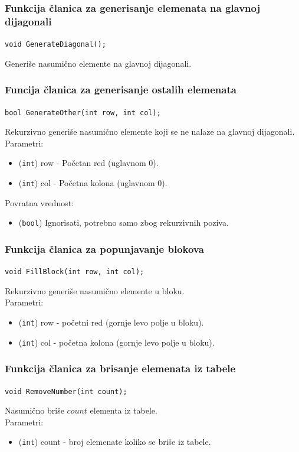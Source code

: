 \documentclass[a4paper]{article}
\begin{document}
    \subsubsection{Funkcija članica za generisanje elemenata na glavnoj dijagonali}
	\texttt{void GenerateDiagonal();}
	\par Generiše nasumično elemente na glavnoj dijagonali.

    \subsubsection{Funcija članica za generisanje ostalih elemenata}
    \texttt{bool GenerateOther(int row, int col);}
    \par Rekurzivno generiše nasumično elemente koji se ne nalaze na glavnoj dijagonali.\\
	Parametri:
    \begin{itemize}
        \item (\texttt{int}) row - Početan red (uglavnom 0).
        \item (\texttt{int}) col - Početna kolona (uglavnom 0).
    \end{itemize}
    Povratna vrednost:
    \begin{itemize}
        \item (\texttt{bool}) Ignorisati, potrebno samo zbog rekurzivnih poziva.
    \end{itemize}
    
    \subsubsection{Funkcija članica za popunjavanje blokova}
    \texttt{void FillBlock(int row, int col);}
    \par Rekurzivno generiše nasumično elemente u bloku.\\
    Parametri:
    \begin{itemize}
        \item (\texttt{int}) row - početni red (gornje levo polje u bloku).
        \item (\texttt{int}) col - početna kolona (gornje levo polje u bloku).
    \end{itemize}

    \subsubsection{Funkcija članica za brisanje elemenata iz tabele}
	\texttt{void RemoveNumber(int count);}
    \par Nasumično briše $count$ elementa iz tabele.\\
    Parametri:
    \begin{itemize}
        \item (\texttt{int}) count - broj elemenate koliko se briše iz tabele.
    \end{itemize}
\end{document}
